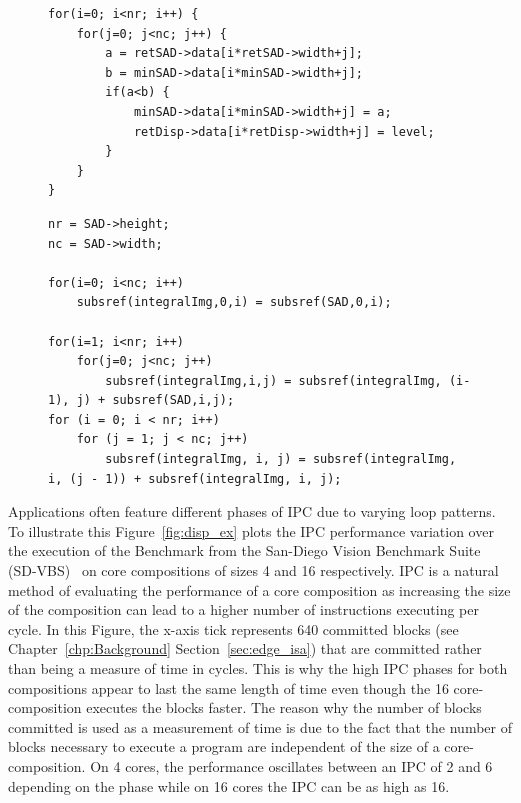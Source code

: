 \begin{figure}[t]
\lstset{language=C,numbersep=4pt}
\begin{center}
\begin{lstlisting}
for(i=0; i<nr; i++) {
	for(j=0; j<nc; j++) {
		a = retSAD->data[i*retSAD->width+j];
		b = minSAD->data[i*minSAD->width+j];
		if(a<b) {
			minSAD->data[i*minSAD->width+j] = a;
			retDisp->data[i*retDisp->width+j] = level;
		}
	}
}

\end{lstlisting}
\end{center}
\vspace{-1em}
\label{lst:low_ipc}
\end{figure}

\begin{figure}[t]
\lstset{language=C,numbersep=4pt}
\begin{center}
\begin{lstlisting}
nr = SAD->height;
nc = SAD->width;

for(i=0; i<nc; i++)
	subsref(integralImg,0,i) = subsref(SAD,0,i);

for(i=1; i<nr; i++)
	for(j=0; j<nc; j++) 
		subsref(integralImg,i,j) = subsref(integralImg, (i-1), j) + subsref(SAD,i,j);
for (i = 0; i < nr; i++)
	for (j = 1; j < nc; j++)
		subsref(integralImg, i, j) = subsref(integralImg, i, (j - 1)) + subsref(integralImg, i, j);

\end{lstlisting}
\end{center}
\vspace{-2em}
\label{lst:high_ipc}
\end{figure}

Applications often feature different phases of IPC due to varying loop patterns.
To illustrate this Figure~\ref{fig:disp_ex} plots the IPC performance variation over the execution of the  Benchmark from the San-Diego Vision Benchmark Suite (SD-VBS)~\cite{sdvbs} on core compositions of sizes 4 and 16 respectively.
IPC is a natural method of evaluating the performance of a core composition as increasing the size of the composition can lead to a higher number of instructions executing per cycle.
In this Figure, the x-axis tick represents 640 committed blocks (see Chapter~\ref{chp:Background} Section~\ref{sec:edge_isa}) that are committed rather than being a measure of time in cycles.
This is why the high IPC phases for both compositions appear to last the same length of time even though the 16 core-composition executes the blocks faster.
The reason why the number of blocks committed is used as a measurement of time is due to the fact that the number of blocks necessary to execute a program are independent of the size of a core-composition.
On 4 cores, the performance oscillates between an IPC of 2 and 6 depending on the phase while on 16 cores the IPC can be as high as 16.

